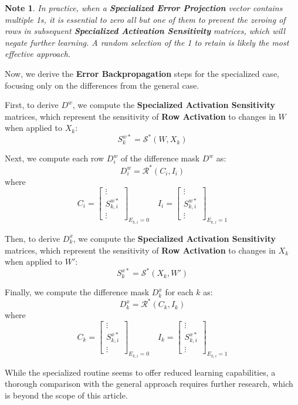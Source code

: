 \documentclass[pmlr]{jmlr}
\newtheorem*{note}{Note}
\begin{document}
\begin{note}
    In practice, when a \textbf{Specialized Error Projection} vector contains multiple 1s, it is essential to zero all but one of them to prevent the zeroing of rows in subsequent \textbf{Specialized Activation Sensitivity} matrices, which will negate further learning. A random selection of the 1 to retain is likely the most effective approach.
\end{note}

Now, we derive the \textbf{Error Backpropagation} steps for the specialized case, focusing only on the differences from the general case.

First, to derive \( D^w \), we compute the \textbf{Specialized Activation Sensitivity} matrices, which represent the sensitivity of \textbf{Row Activation} to changes in \( W \) when applied to \( X_k \):
\[ S^{w*}_k = \mathcal{S}^*(W, X_k) \]

Next, we compute each row \( D^w_i \) of the difference mask \( D^w \) as:
\[ D^w_i = \mathcal{R}^*(C_i, I_i) \]
where
\[ C_i = \begin{bmatrix} \vdots \\ S^{w*}_{k,i} \\ \vdots \end{bmatrix}_{E_{k,i} = 0} \quad I_i = \begin{bmatrix} \vdots \\ S^{w*}_{k,i} \\ \vdots \end{bmatrix}_{E_{k,i} = 1} \]

Then, to derive \( D^x_k \), we compute the \textbf{Specialized Activation Sensitivity} matrices, which represent the sensitivity of \textbf{Row Activation} to changes in \( X_k \) when applied to \( W' \):
\[ S^{x*}_k = \mathcal{S}^*(X_k, W') \]

Finally, we compute the difference mask \( D^x_k \) for each \( k \) as:
\[ D^x_k = \mathcal{R}^*(C_k, I_k) \]
where
\[ C_k = \begin{bmatrix} \vdots \\ S^{x*}_{k,i} \\ \vdots \end{bmatrix}_{E_{k,i} = 0} \quad I_k = \begin{bmatrix} \vdots \\ S^{x*}_{k,i} \\ \vdots \end{bmatrix}_{E_{k,i} = 1} \]

While the specialized routine seems to offer reduced learning capabilities, a thorough comparison with the general approach requires further research, which is beyond the scope of this article.
\end{document}

